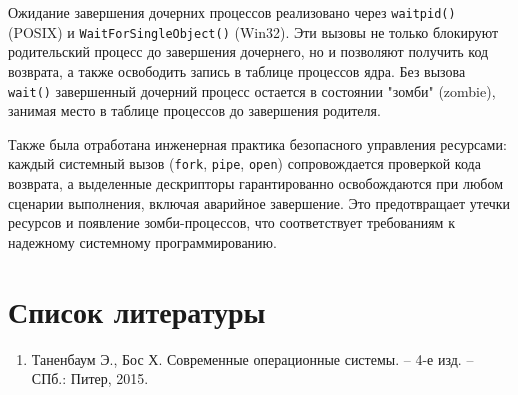 \documentclass[pdf, unicode, 12pt, a4paper, oneside, fleqn]{article}
\begin{document}
Ожидание завершения дочерних процессов реализовано через \texttt{waitpid()} (POSIX) и \texttt{WaitForSingleObject()} (Win32). Эти вызовы не только блокируют родительский процесс до завершения дочернего, но и позволяют получить код возврата, а также освободить запись в таблице процессов ядра. Без вызова \texttt{wait()} завершенный дочерний процесс остается в состоянии "зомби" (zombie), занимая место в таблице процессов до завершения родителя.

Также была отработана инженерная практика безопасного управления ресурсами: каждый системный вызов (\texttt{fork}, \texttt{pipe}, \texttt{open}) сопровождается проверкой кода возврата, а выделенные дескрипторы гарантированно освобождаются при любом сценарии выполнения, включая аварийное завершение. Это предотвращает утечки ресурсов и появление зомби-процессов, что соответствует требованиям к надежному системному программированию.
\pagebreak


\section{Список литературы}
\begin{enumerate}
    \item Таненбаум Э., Бос Х. Современные операционные системы. – 4-е изд. – СПб.: Питер, 2015.
\end{enumerate}
\end{document}
